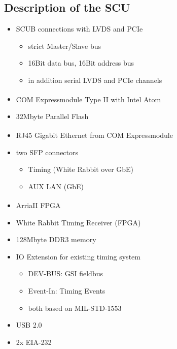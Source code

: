 \documentclass[25pt,halfparskip-,pagesize]{scrartcl}
\def\TTra{\textsuperscript{\texttrademark}}
\begin{document}
\begin{multicols*}{3}
\section{Description of the SCU}
\begin{itemize}
	\item SCUB connections with LVDS and PCIe
	\begin{itemize}
		\item strict Master/Slave bus
		\item 16Bit data bus, 16Bit address bus
		\item in addition serial LVDS and PCIe channels
	\end{itemize}
	\item COM Express\TTra module Type II with Intel Atom
	\item 32Mbyte Parallel Flash
	\item RJ45 Gigabit Ethernet from COM Express\TTra module
	\item two SFP connectors
	\begin{itemize}
		\item Timing (White Rabbit over GbE)
		\item AUX LAN (GbE)
	\end{itemize}
	\item Arria\TTra II FPGA
	\item White Rabbit Timing Receiver (FPGA)
	\item 128Mbyte DDR3 memory
	\item IO Extension for existing timing system
	\begin{itemize}
		\item DEV-BUS: GSI fieldbus
		\item Event-In: Timing Events
		\item both based on MIL-STD-1553
	\end{itemize}
	\item USB 2.0
	\item 2x EIA-232
\end{itemize}




\end{multicols*}
\end{document}
